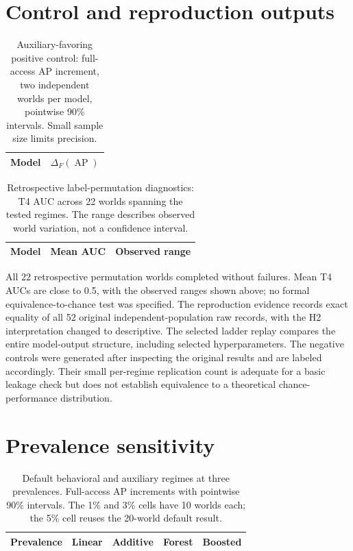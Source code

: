 \documentclass[11pt,a4paper]{article}
\newcommand{\AP}{\operatorname{AP}}
\begin{document}
\section{Control and reproduction outputs}\label{app:controls}
\begin{table}[H]\centering\small
\caption{Auxiliary-favoring positive control: full-access AP increment, two independent worlds per model, pointwise 90\% intervals. Small sample size limits precision.}
\begin{tabular}{lc}\toprule Model & $\Delta_F(\AP)$ \\\midrule
\end{tabular}
\end{table}
\begin{table}[H]\centering\small
\caption{Retrospective label-permutation diagnostics: T4 AUC across 22 worlds spanning the tested regimes. The range describes observed world variation, not a confidence interval.}
\begin{tabular}{lcc}\toprule Model & Mean AUC & Observed range \\\midrule
\end{tabular}
\end{table}
All 22 retrospective permutation worlds completed without failures. Mean T4 AUCs are close to 0.5, with the observed ranges shown above; no formal equivalence-to-chance test was specified. The reproduction evidence records exact equality of all 52 original independent-population raw records, with the H2 interpretation changed to descriptive. The selected ladder replay compares the entire model-output structure, including selected hyperparameters. The negative controls were generated after inspecting the original results and are labeled accordingly. Their small per-regime replication count is adequate for a basic leakage check but does not establish equivalence to a theoretical chance-performance distribution.

\section{Prevalence sensitivity}\label{app:prevalence}
\begin{table}[H]\centering\scriptsize
\caption{Default behavioral and auxiliary regimes at three prevalences. Full-access AP increments with pointwise 90\% intervals. The 1\% and 3\% cells have 10 worlds each; the 5\% cell reuses the 20-world default result.}
\begin{tabular}{lcccc}\toprule Prevalence & Linear & Additive & Forest & Boosted \\\midrule
\end{tabular}
\end{table}
\end{document}
